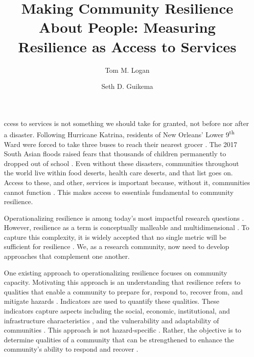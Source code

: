 \documentclass[9pt,twocolumn,twoside,lineno]{pnas-new}
\title{Making Community Resilience About People: Measuring Resilience as Access to Services} %
\author[]{Tom M. Logan}
\author{Seth D. Guikema}
\affil{Industrial and Operations Engineering, University of Michigan, Ann Arbor, USA}
\begin{document}
\maketitle
\thispagestyle{firststyle}


ccess to services is not something we should take for granted, not before nor after a disaster. Following Hurricane Katrina, residents of New Orleans' Lower 9\textsuperscript{th} Ward were forced to take three buses to reach their nearest grocer \cite{Netter2016-dm}. 
The 2017 South Asian floods raised fears that thousands of children permanently to dropped out of school \cite{Watt2017-bs}. 
Even without these disasters, communities throughout the world live within food deserts, health care deserts, and that list goes on. 
Access to these, and other, services is important because, without it, communities cannot function \cite{Winter1997-kc, Logan2017-fr, Dempsey2011-og}.
This makes access to essentials fundamental to community resilience.

Operationalizing resilience is among today's most impactful research questions \cite{Caldarice2019-tv}.
However, resilience as a term is conceptually malleable and multidimensional \cite{Caldarice2019-tv}. 
To capture this complexity, it is widely accepted that no single metric will be sufficient for resilience \cite{Bruneau2003-px, Sharma2018-rs, Haimes2009-gj, Levine2014-je, Cutter2014-jm, Cutter2016-landscape}.
We, as a research community, now need to develop approaches that complement one another.

One existing approach to operationalizing resilience focuses on community capacity. 
Motivating this approach is an understanding that resilience refers to qualities that enable a community to prepare for, respond to, recover from, and mitigate hazards \cite{Cutter2014-jm, Zautra2008-rb}.
Indicators are used to quantify these qualities.
These indicators capture aspects including the social, economic, institutional, and infrastructure characteristics \cite{Cutter2014-jm, Cutter2010-vg, Cutter2016-landscape, Sherrieb2010-nk}, and the vulnerability and adaptability of communities \cite{Lam2016-qn}.
This approach is not hazard-specific \cite{Koliou2018-jt}.
Rather, the objective is to determine qualities of a community that can be strengthened to enhance the community's ability to respond and recover \cite{Cutter2014-jm, Cutter2010-vg, Sherrieb2010-nk}. 
\end{document}
